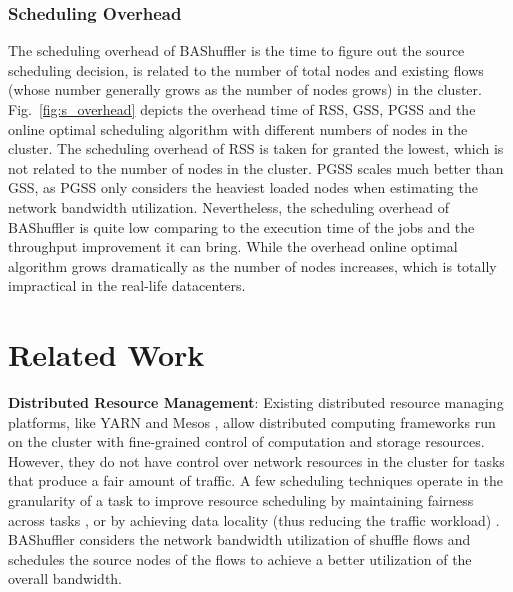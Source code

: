 \documentclass[10pt,journal,compsoc]{IEEEtran}
\begin{document}
\subsubsection{Scheduling Overhead}\label{section:eva_overhead}
The scheduling overhead of BAShuffler is the time to figure out the source scheduling decision, is related to the number of total nodes and existing flows (whose number generally grows as the number of nodes grows) in the cluster. 
Fig.~\ref{fig:s_overhead} depicts the overhead time of RSS, GSS, PGSS and the online optimal scheduling algorithm
with different numbers of nodes in the cluster.
The scheduling overhead of RSS is taken for granted the lowest, which is not related to the number of nodes in the cluster. 
PGSS scales much better than GSS, as PGSS only considers the heaviest loaded nodes when estimating the network bandwidth utilization. 
Nevertheless, the scheduling overhead of BAShuffler is quite low comparing to the execution time of the jobs and the throughput improvement it can bring. 
While the overhead online optimal algorithm grows dramatically as the number of nodes increases, which is totally impractical in the real-life datacenters. 


\section{Related Work}\label{section:relatedwork}
\textbf{Distributed Resource Management}:
Existing distributed resource managing platforms, like YARN
\cite{vavilapalli2013apache} and Mesos \cite{hindman2011mesos},
allow distributed computing frameworks run on the cluster with
fine-grained control of computation and storage resources.
However, they do not have control over network resources in the cluster for
tasks that produce a fair amount of traffic.
A few scheduling techniques operate in the granularity of a task to improve
resource scheduling by maintaining fairness across tasks
\cite{zaharia2010delay, isard2009quincy},
or by achieving data locality (thus reducing the traffic workload)
\cite{dean2008mapreduce, zaharia2008improving,faraz2014shufflewatcher}.
BAShuffler considers the network bandwidth utilization of shuffle
flows and schedules the source nodes of the flows to achieve a better
utilization of the overall bandwidth.
\end{document}
